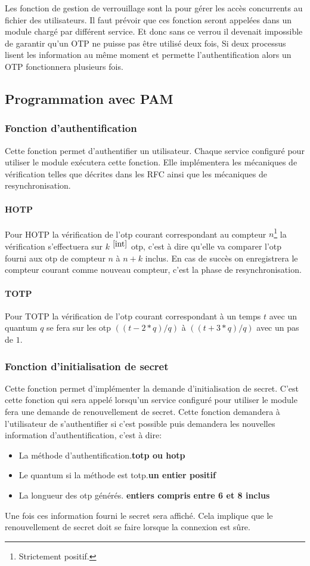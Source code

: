 Les fonction de gestion de verrouillage sont la pour gérer les accès concurrents
au fichier des utilisateurs. Il faut prévoir que ces fonction seront appelées
dans un module chargé par différent service. Et donc sans ce verrou il devenait
impossible de garantir qu'un OTP ne puisse pas être utilisé deux fois, Si deux
processus lisent les information au même moment et permette l'authentification
alors un OTP fonctionnera plusieurs fois.

\subsection{Programmation avec PAM}
\subsubsection{Fonction d'authentification}
Cette fonction permet d'authentifier un utilisateur. Chaque service configuré
pour utiliser le module exécutera cette fonction. Elle implémentera les
mécaniques de vérification telles que décrites dans les RFC ainsi que les
mécaniques de resynchronisation.
\paragraph{HOTP}
Pour HOTP la vérification de l'otp courant correspondant au compteur
$n$\footnote{Strictement positif.\label{int}} la vérification s'effectuera sur
$k$ $^{\ref{int}}$ otp, c'est à dire qu'elle va comparer l'otp fourni aux otp de
compteur $n$ à $n+k$ inclus. En cas de succès on enregistrera le compteur
courant comme nouveau compteur, c'est la phase de resynchronisation.
\paragraph{TOTP}
Pour TOTP la vérification de l'otp courant correspondant à un temps $t$ avec un
quantum $q$ se fera sur les otp $((t - 2 * q) / q) $ à $((t + 3 * q) / q) $ avec un
pas de $1$.
\subsubsection{Fonction d'initialisation de secret}
Cette fonction permet d'implémenter la demande d'initialisation de secret.
C'est cette fonction qui sera appelé lorsqu'un service configuré pour utiliser
le module fera une demande de renouvellement de secret. Cette fonction demandera
à l'utilisateur de s'authentifier si c'est possible puis demandera les nouvelles
information d'authentification, c'est à dire:
\begin{itemize}
  \item La méthode d'authentification.\hfill\textbf{totp ou hotp}
  \item Le quantum si la méthode est totp.\hfill \textbf{un entier positif}
  \item La longueur des otp générés.
  \hfill\textbf{entiers compris entre 6 et 8 inclus}
\end{itemize}
Une fois ces information fourni le secret sera affiché. Cela implique que le
renouvellement de secret doit se faire lorsque la connexion est sûre.

